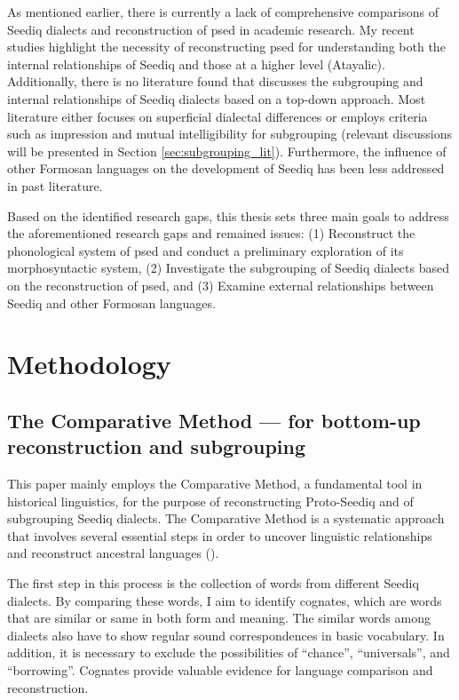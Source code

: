 As mentioned earlier, there is currently a lack of comprehensive comparisons of Seediq dialects and reconstruction of \acl{psed} in academic research. My recent studies highlight the necessity of reconstructing \acl{psed} for understanding both the internal relationships of Seediq and those at a higher level (Atayalic). Additionally, there is no literature found that discusses the subgrouping and internal relationships of Seediq dialects based on a top-down approach. Most literature either focuses on superficial dialectal differences or employs criteria such as impression and mutual intelligibility for subgrouping (relevant discussions will be presented in Section \ref{sec:subgrouping_lit}). Furthermore, the influence of other Formosan languages on the development of Seediq has been less addressed in past literature.

Based on the identified research gaps, this thesis sets three main goals to address the aforementioned research gaps and remained issues: (1) Reconstruct the phonological system of \acl{psed} and conduct a preliminary exploration of its morphosyntactic system, (2) Investigate the subgrouping of Seediq dialects based on the reconstruction of \acl{psed}, and (3) Examine external relationships between Seediq and other Formosan languages.


\section{Methodology}\label{sec:methodology}

\subsection{The Comparative Method --- for bottom-up reconstruction and subgrouping}

This paper mainly employs the Comparative Method, a fundamental tool in historical linguistics, for the purpose of reconstructing Proto-Seediq and of subgrouping Seediq dialects. The Comparative Method is a systematic approach that involves several essential steps in order to uncover linguistic relationships and reconstruct ancestral languages (\cite{fox1995linguistic}).

The first step in this process is the collection of words from different Seediq dialects. By comparing these words, I aim to identify cognates, which are words that are similar or same in both form and meaning. The similar words among dialects also have to show regular sound correspondences in basic vocabulary. In addition, it is necessary to exclude the possibilities of ``chance'', ``universals'', and ``borrowing''. Cognates provide valuable evidence for language comparison and reconstruction.

